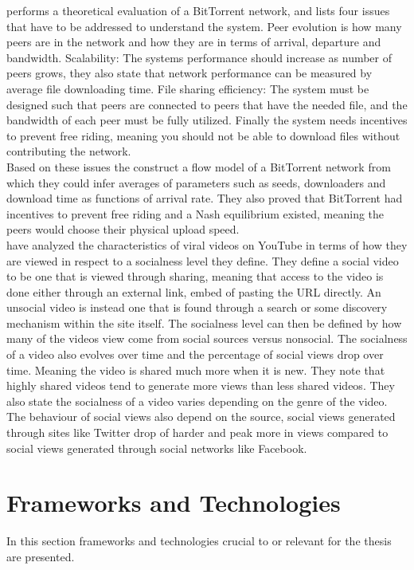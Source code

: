 \citeauthor{qiu2004modeling} \cite{qiu2004modeling} performs a theoretical evaluation of a BitTorrent network, and lists four issues that have to be addressed to understand the system.
Peer evolution is how many peers are in the network and how they are in terms of arrival, departure and bandwidth.
Scalability: The systems performance should increase as number of peers grows, they also state that network performance can be measured by average file downloading time.
File sharing efficiency: The system must be designed such that peers are connected to peers that have the needed file, and the bandwidth of each peer must be fully utilized.
Finally the system needs incentives to prevent free riding, meaning you should not be able to download files without contributing the network.\\
Based on these issues the construct a flow model of a BitTorrent network from which they could infer averages of parameters such as seeds, downloaders and download time as functions of arrival rate. They also proved that BitTorrent had incentives to prevent free riding and a Nash equilibrium existed, meaning the peers would choose their physical upload speed.
\\


\citeauthor{broxton2013catching} \cite{broxton2013catching} have analyzed the characteristics of viral videos on YouTube in terms of how they are viewed in respect to a socialness level they define. They define a social video to be one that is viewed through sharing, meaning that access to the video is done either through an external link, embed of pasting the URL directly. An unsocial video is instead one that is found through a search or some discovery mechanism within the site itself. The socialness level can then be defined by how many of the videos view come from social sources versus nonsocial. The socialness of a video also evolves over time and the percentage of social views drop over time. Meaning the video is shared much more when it is new. They note that highly shared videos tend to generate more views than less shared videos. They also state the socialness of a video varies depending on the genre of the video. The behaviour of social views also depend on the source, social views generated through sites like Twitter drop of harder and peak more in views compared to social views generated through social networks like Facebook.


\section{Frameworks and Technologies}
\label{sec:fram-techn}
In this section frameworks and technologies crucial to or relevant for the thesis are presented.

